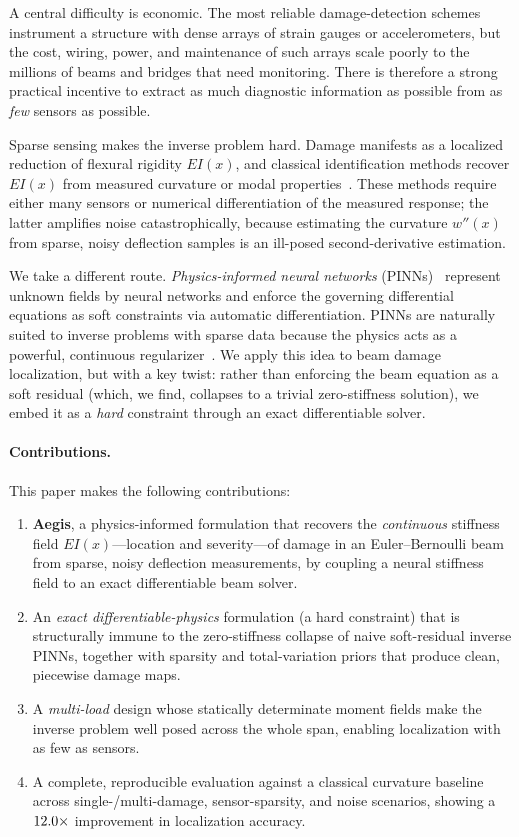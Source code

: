 \documentclass[11pt]{article}
\newcommand{\EI}{\mathit{EI}}
\begin{document}
A central difficulty is economic. The most reliable damage-detection schemes
instrument a structure with dense arrays of strain gauges or accelerometers, but
the cost, wiring, power, and maintenance of such arrays scale poorly to the
millions of beams and bridges that need monitoring. There is therefore a strong
practical incentive to extract as much diagnostic information as possible from as
\emph{few} sensors as possible.

Sparse sensing makes the inverse problem hard. Damage manifests as a localized
reduction of flexural rigidity $\EI(x)$, and classical identification methods
recover $\EI(x)$ from measured curvature or modal
properties~\cite{pandey1991damage,kim2003damage}. These methods require either
many sensors or numerical differentiation of the measured response; the latter
amplifies noise catastrophically, because estimating the curvature $w''(x)$ from
sparse, noisy deflection samples is an ill-posed second-derivative estimation.

We take a different route. \emph{Physics-informed neural networks}
(PINNs)~\cite{raissi2019physics,karniadakis2021physics} represent unknown fields
by neural networks and enforce the governing differential equations as soft
constraints via automatic differentiation. PINNs are naturally suited to inverse
problems with sparse data because the physics acts as a powerful, continuous
regularizer~\cite{raissi2019physics}. We apply this idea to beam damage
localization, but with a key twist: rather than enforcing the beam equation as a
soft residual (which, we find, collapses to a trivial zero-stiffness solution),
we embed it as a \emph{hard} constraint through an exact differentiable solver.

\paragraph{Contributions.} This paper makes the following contributions:
\begin{enumerate}[leftmargin=1.4em,itemsep=2pt]
  \item \textbf{Aegis}, a physics-informed formulation that recovers the
  \emph{continuous} stiffness field $\EI(x)$---location and severity---of damage
  in an Euler--Bernoulli beam from sparse, noisy deflection measurements, by
  coupling a neural stiffness field to an exact differentiable beam solver.
  \item An \emph{exact differentiable-physics} formulation (a hard constraint)
  that is structurally immune to the zero-stiffness collapse of naive
  soft-residual inverse PINNs, together with sparsity and total-variation priors
  that produce clean, piecewise damage maps.
  \item A \emph{multi-load} design whose statically determinate moment fields
  make the inverse problem well posed across the whole span, enabling
  localization with as few as \minsensors{} sensors.
  \item A complete, reproducible evaluation against a classical curvature
  baseline across single-/multi-damage, sensor-sparsity, and noise scenarios,
  showing a $12.0\times$ improvement in localization accuracy.
\end{enumerate}
\end{document}
